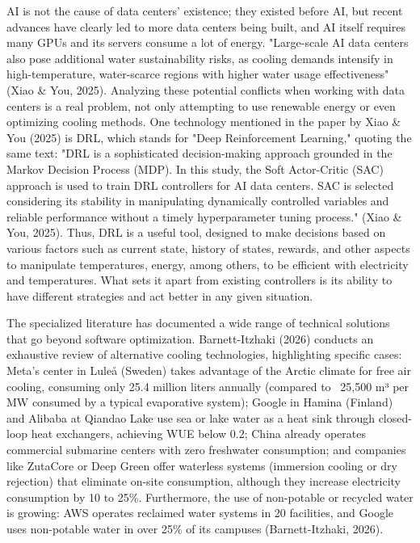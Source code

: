 \documentclass[conference]{IEEEtran}
\begin{document}
AI is not the cause of data centers' existence; they existed before AI, but recent advances have clearly led to more data centers being built, and AI itself requires many GPUs and its servers consume a lot of energy. "Large-scale AI data centers also pose additional water sustainability risks, as cooling demands intensify in high-temperature, water-scarce regions with higher water usage effectiveness" (Xiao \& You, 2025). Analyzing these potential conflicts when working with data centers is a real problem, not only attempting to use renewable energy or even optimizing cooling methods. One technology mentioned in the paper by Xiao \& You (2025) is DRL, which stands for "Deep Reinforcement Learning," quoting the same text: "DRL is a sophisticated decision-making approach grounded in the Markov Decision Process (MDP). In this study, the Soft Actor-Critic (SAC) approach is used to train DRL controllers for AI data centers. SAC is selected considering its stability in manipulating dynamically controlled variables and reliable performance without a timely hyperparameter tuning process." (Xiao \& You, 2025). Thus, DRL is a useful tool, designed to make decisions based on various factors such as current state, history of states, rewards, and other aspects to manipulate temperatures, energy, among others, to be efficient with electricity and temperatures. What sets it apart from existing controllers is its ability to have different strategies and act better in any given situation.

The specialized literature has documented a wide range of technical solutions that go beyond software optimization. Barnett-Itzhaki (2026) conducts an exhaustive review of alternative cooling technologies, highlighting specific cases: Meta's center in Luleå (Sweden) takes advantage of the Arctic climate for free air cooling, consuming only 25.4 million liters annually (compared to ~25,500 m³ per MW consumed by a typical evaporative system); Google in Hamina (Finland) and Alibaba at Qiandao Lake use sea or lake water as a heat sink through closed-loop heat exchangers, achieving WUE below 0.2; China already operates commercial submarine centers with zero freshwater consumption; and companies like ZutaCore or Deep Green offer waterless systems (immersion cooling or dry rejection) that eliminate on-site consumption, although they increase electricity consumption by 10 to 25\%. Furthermore, the use of non-potable or recycled water is growing: AWS operates reclaimed water systems in 20 facilities, and Google uses non-potable water in over 25\% of its campuses (Barnett-Itzhaki, 2026).
\end{document}
